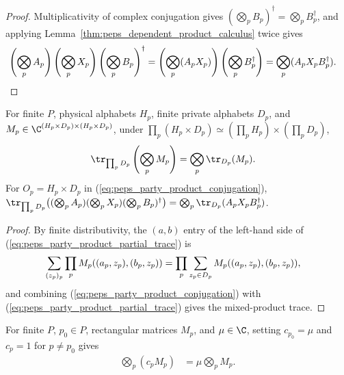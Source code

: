 \begin{proof}\leanok
    Multiplicativity of complex conjugation gives
    $(\bigotimes_p B_p)^\dagger=\bigotimes_p B_p^\dagger$, and applying
    Lemma~\ref{thm:peps_dependent_product_calculus} twice gives
    \begin{align}
        \left(\bigotimes_p A_p\right)\left(\bigotimes_p X_p\right)\left(\bigotimes_p B_p\right)^\dagger
         & =\left(\bigotimes_p(A_pX_p)\right)\left(\bigotimes_p B_p^\dagger\right)
        =\bigotimes_p(A_pX_pB_p^\dagger).\notag
    \end{align}
\end{proof}

\begin{lemma}
    \label{thm:peps_party_product_partial_trace}
    \leanok
    For finite $P$, physical alphabets $H_p$, finite private alphabets $D_p$,
    and $M_p\in\C^{(H_p\times D_p)\times(H_p\times D_p)}$, under
    $\prod_p(H_p\times D_p)\simeq(\prod_pH_p)\times(\prod_pD_p)$,
    \begin{align}
        \tr_{\prod_pD_p}\left(\bigotimes_p M_p\right)
         & =\bigotimes_p\tr_{D_p}(M_p).
        \label{eq:peps_party_product_partial_trace}
    \end{align}
    For $O_p=H_p\times D_p$ in (\ref{eq:peps_party_product_conjugation}),
    $\tr_{\prod_pD_p}\bigl((\bigotimes_p A_p)(\bigotimes_p X_p)(\bigotimes_p B_p)^\dagger\bigr)
        =\bigotimes_p\tr_{D_p}(A_pX_pB_p^\dagger)$.
\end{lemma}

\begin{proof}\leanok
    By finite distributivity, the $(a,b)$ entry of the left-hand side of
    (\ref{eq:peps_party_product_partial_trace}) is
    \begin{align}
        \sum_{(z_p)_p}\prod_p M_p((a_p,z_p),(b_p,z_p))
         & =\prod_p\sum_{z_p\in D_p}
        M_p((a_p,z_p),(b_p,z_p)),\notag
    \end{align}
    and combining (\ref{eq:peps_party_product_conjugation}) with
    (\ref{eq:peps_party_product_partial_trace}) gives the mixed-product trace.
\end{proof}

\begin{lemma}
    \label{thm:peps_party_product_scalar}
    \leanok
    For finite $P$, $p_0\in P$, rectangular matrices $M_p$, and $\mu\in\C$,
    setting $c_{p_0}=\mu$ and $c_p=1$ for $p\neq p_0$ gives
    \begin{align}
        \bigotimes_p(c_pM_p)
         & =\mu\bigotimes_pM_p.
        \label{eq:peps_party_product_scalar}
    \end{align}
\end{lemma}

